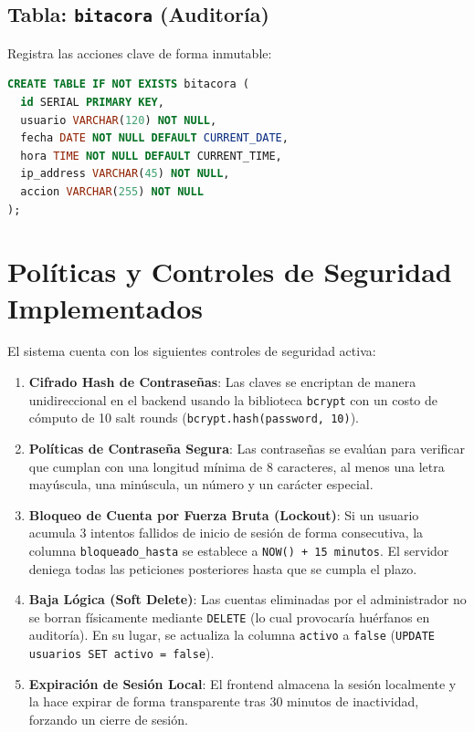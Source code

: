 \documentclass[11pt,a4paper]{article}
\begin{document}
\subsection{Tabla: \texttt{bitacora} (Auditoría)}
Registra las acciones clave de forma inmutable:
\begin{lstlisting}[language=SQL, caption=Definición física de la tabla de bitácora]
CREATE TABLE IF NOT EXISTS bitacora (
  id SERIAL PRIMARY KEY,
  usuario VARCHAR(120) NOT NULL,                       
  fecha DATE NOT NULL DEFAULT CURRENT_DATE,            
  hora TIME NOT NULL DEFAULT CURRENT_TIME,            
  ip_address VARCHAR(45) NOT NULL,                     
  accion VARCHAR(255) NOT NULL                         
);
\end{lstlisting}

\section{Políticas y Controles de Seguridad Implementados}
El sistema cuenta con los siguientes controles de seguridad activa:

\begin{enumerate}
    \item \textbf{Cifrado Hash de Contraseñas}: Las claves se encriptan de manera unidireccional en el backend usando la biblioteca \texttt{bcrypt} con un costo de cómputo de 10 salt rounds (\texttt{bcrypt.hash(password, 10)}).
    \item \textbf{Políticas de Contraseña Segura}: Las contraseñas se evalúan para verificar que cumplan con una longitud mínima de 8 caracteres, al menos una letra mayúscula, una minúscula, un número y un carácter especial.
    \item \textbf{Bloqueo de Cuenta por Fuerza Bruta (Lockout)}: Si un usuario acumula 3 intentos fallidos de inicio de sesión de forma consecutiva, la columna \texttt{bloqueado\_hasta} se establece a \texttt{NOW() + 15 minutos}. El servidor deniega todas las peticiones posteriores hasta que se cumpla el plazo.
    \item \textbf{Baja Lógica (Soft Delete)}: Las cuentas eliminadas por el administrador no se borran físicamente mediante \texttt{DELETE} (lo cual provocaría huérfanos en auditoría). En su lugar, se actualiza la columna \texttt{activo} a \texttt{false} (\texttt{UPDATE usuarios SET activo = false}).
    \item \textbf{Expiración de Sesión Local}: El frontend almacena la sesión localmente y la hace expirar de forma transparente tras 30 minutos de inactividad, forzando un cierre de sesión.
\end{enumerate}
\end{document}
